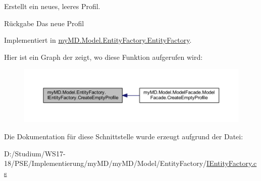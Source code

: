 Erstellt ein neues, leeres Profil. 

\begin{DoxyReturn}{Rückgabe}
Das neue Profil
\end{DoxyReturn}


Implementiert in \mbox{\hyperlink{classmy_m_d_1_1_model_1_1_entity_factory_1_1_entity_factory_ac48b89bd93d6f39965d805b5f6af5f35}{my\+M\+D.\+Model.\+Entity\+Factory.\+Entity\+Factory}}.

Hier ist ein Graph der zeigt, wo diese Funktion aufgerufen wird\+:\nopagebreak
\begin{figure}[H]
\begin{center}
\leavevmode
\includegraphics[width=350pt]{interfacemy_m_d_1_1_model_1_1_entity_factory_1_1_i_entity_factory_add734631a85e6021f04c4185f66e351d_icgraph}
\end{center}
\end{figure}


Die Dokumentation für diese Schnittstelle wurde erzeugt aufgrund der Datei\+:\begin{DoxyCompactItemize}
\item 
D\+:/\+Studium/\+W\+S17-\/18/\+P\+S\+E/\+Implementierung/my\+M\+D/my\+M\+D/\+Model/\+Entity\+Factory/\mbox{\hyperlink{_i_entity_factory_8cs}{I\+Entity\+Factory.\+cs}}\end{DoxyCompactItemize}
